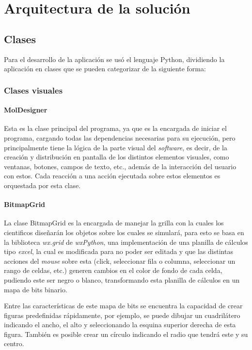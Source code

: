 \chapter{Arquitectura de la solución}
\label{cap:arquitectura}


\section{Clases}

Para el desarrollo de la aplicación se usó el lenguaje Python, dividiendo la aplicación en clases que se pueden categorizar de la siguiente forma:

\subsection{Clases visuales}

\subsubsection{MolDesigner}
Esta es la clase principal del programa, ya que es la encargada de iniciar el programa, cargando todas las dependencias necesarias para su ejecución, pero principalmente tiene la lógica de la parte visual del \emph{software}, es decir, de la creación y distribución en pantalla de los distintos elementos visuales, como ventanas, botones, campos de texto, etc., además de la interacción del usuario con estos. Cada reacción a una acción ejecutada sobre estos elementos es orquestada por esta clase.

\subsubsection{BitmapGrid}
La clase BitmapGrid es la encargada de manejar la grilla con la cuales los cientificos diseñarán los objetos sobre los cuales se simulará, para esto se basa en la biblioteca \emph{wx.grid} de \emph{wxPython}, una implementación de una planilla de cálculos tipo \emph{excel}, la cual es modificada para no poder ser editada y que las distintas acciones del \emph{mouse} sobre esta (click, seleccionar fila o columna, seleccionar un rango de celdas, etc.) generen cambios en el color de fondo de cada celda, pudiendo este ser negro o blanco, transformando esta planilla de cálculos en un mapa de bits binario.

Entre las características de este mapa de bits se encuentra la capacidad de crear figuras predefinidas rápidamente, por ejemplo, se puede dibujar un cuadrilátero indicando el ancho, el alto y seleccionando la esquina superior derecha de esta figura. También es posible crear un círculo indicando el radio que tendrá este y su centro.

